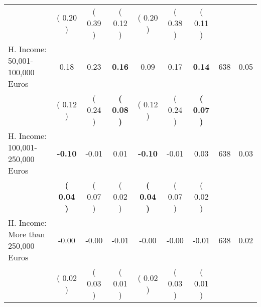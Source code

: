 \begin{tabular}{lcccccccc}
 & (     0.20 ) & (     0.39 ) & (     0.12 ) & (     0.20 ) & (     0.38 ) & (     0.11 ) & \\
H. Income: 50,001-100,000 Euros &      0.18 &      0.23 & \textbf{     0.16} &      0.09 &      0.17 & \textbf{     0.14} & 638 &       0.05 \\ 
 & (     0.12 ) & (     0.24 ) & \textbf{(     0.08 )} & (     0.12 ) & (     0.24 ) & \textbf{(     0.07 )} & \\
H. Income: 100,001-250,000 Euros & \textbf{    -0.10} &     -0.01 &      0.01 & \textbf{    -0.10} &     -0.01 &      0.03 & 638 &       0.03 \\ 
 & \textbf{(     0.04 )} & (     0.07 ) & (     0.02 ) & \textbf{(     0.04 )} & (     0.07 ) & (     0.02 ) & \\
H. Income: More than 250,000 Euros &     -0.00 &     -0.00 &     -0.01 &     -0.00 &     -0.00 &     -0.01 & 638 &       0.02 \\ 
 & (     0.02 ) & (     0.03 ) & (     0.01 ) & (     0.02 ) & (     0.03 ) & (     0.01 ) & \\
\bottomrule
\end{tabular}
